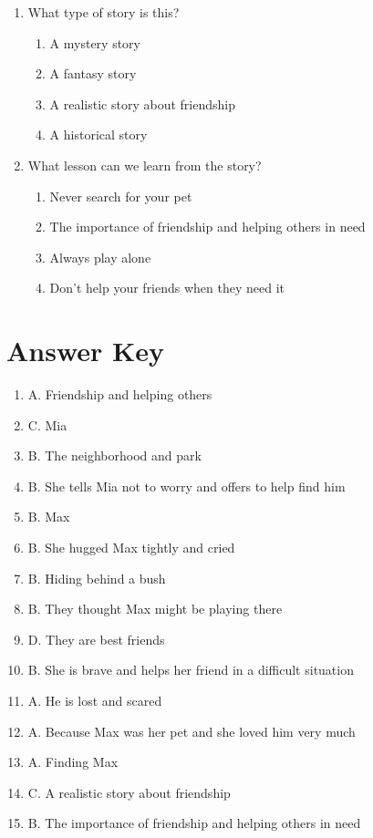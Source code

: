 \documentclass[12pt]{article}
\begin{document}
\begin{enumerate}
    \item What type of story is this?
    \begin{enumerate}[label=\Alph*.]
        \item A mystery story
        \item A fantasy story
        \item A realistic story about friendship
        \item A historical story
    \end{enumerate}
    \vspace{0.5cm}

    \item What lesson can we learn from the story?
    \begin{enumerate}[label=\Alph*.]
        \item Never search for your pet
        \item The importance of friendship and helping others in need
        \item Always play alone
        \item Don't help your friends when they need it
    \end{enumerate}
    \vspace{0.5cm}

\end{enumerate}
\newpage

\section*{Answer Key}

\begin{enumerate}

    \item A. Friendship and helping others
    \item C. Mia
    \item B. The neighborhood and park
    \item B. She tells Mia not to worry and offers to help find him
    \item B. Max
    \item B. She hugged Max tightly and cried
    \item B. Hiding behind a bush
    \item B. They thought Max might be playing there
    \item D. They are best friends
    \item B. She is brave and helps her friend in a difficult situation
    \item A. He is lost and scared
    \item A. Because Max was her pet and she loved him very much
    \item A. Finding Max
    \item C. A realistic story about friendship
    \item B. The importance of friendship and helping others in need

\end{enumerate}
\end{document}
